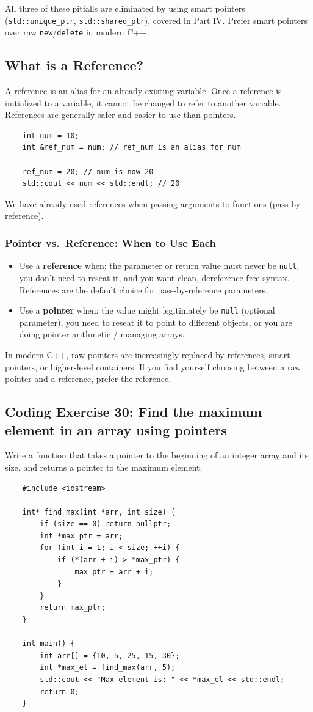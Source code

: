 \begin{remark}
	All three of these pitfalls are eliminated by using smart pointers (\texttt{std::unique\_ptr}, \texttt{std::shared\_ptr}), covered in Part IV. Prefer smart pointers over raw \texttt{new}/\texttt{delete} in modern C++.
\end{remark}

\subsection{What is a Reference?}
A reference is an alias for an already existing variable. Once a reference is initialized to a variable, it cannot be changed to refer to another variable. References are generally safer and easier to use than pointers.
\begin{lstlisting}
	int num = 10;
	int &ref_num = num; // ref_num is an alias for num

	ref_num = 20; // num is now 20
	std::cout << num << std::endl; // 20
\end{lstlisting}
We have already used references when passing arguments to functions (pass-by-reference).

\subsubsection{Pointer vs.\ Reference: When to Use Each}
\begin{itemize}
	\item Use a \textbf{reference} when: the parameter or return value must never be \texttt{null}, you don't need to reseat it, and you want clean, dereference-free syntax. References are the default choice for pass-by-reference parameters.
	\item Use a \textbf{pointer} when: the value might legitimately be \texttt{null} (optional parameter), you need to reseat it to point to different objects, or you are doing pointer arithmetic / managing arrays.
\end{itemize}
In modern C++, raw pointers are increasingly replaced by references, smart pointers, or higher-level containers. If you find yourself choosing between a raw pointer and a reference, prefer the reference.

\subsection{Coding Exercise 30: Find the maximum element in an array using pointers}
Write a function that takes a pointer to the beginning of an integer array and its size, and returns a pointer to the maximum element.
\begin{lstlisting}
	#include <iostream>

	int* find_max(int *arr, int size) {
		if (size == 0) return nullptr;
		int *max_ptr = arr;
		for (int i = 1; i < size; ++i) {
			if (*(arr + i) > *max_ptr) {
				max_ptr = arr + i;
			}
		}
		return max_ptr;
	}

	int main() {
		int arr[] = {10, 5, 25, 15, 30};
		int *max_el = find_max(arr, 5);
		std::cout << "Max element is: " << *max_el << std::endl;
		return 0;
	}
\end{lstlisting}

